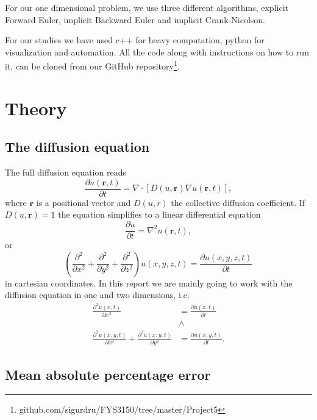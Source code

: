 \documentclass[reprint, english,notitlepage,nofootinbib]{revtex4-1}  %
\begin{document}
For our one dimensional problem, we use three different algorithms, explicit Forward Euler, implicit Backward Euler and implicit Crank-Nicolson.

For our studies we have used c++ for heavy computation, python for visualization and automation. All the code along with instructions on how to run it, can be cloned from our GitHub repository\footnote{github.com/sigurdru/FYS3150/tree/master/Project5}.

\section{Theory}

\subsection*{The diffusion equation}

The full diffusion equation reads
\begin{equation*}
	\frac{\partial u(\mathbf{r}, t)}{\partial t} = \nabla \cdot \left[D(u, \mathbf{r})\nabla u(\mathbf{r}, t)\right],
\end{equation*}
where $\mathbf{r}$ is a positional vector and $D(u,r)$ the collective diffusion coefficient. If $D(u,\mathbf{r}) = 1$ the equation simplifies to a linear differential equation
\begin{equation*}
	\frac{\partial u}{\partial t} = \nabla^2u(\mathbf{r}, t),
\end{equation*}
or
\begin{equation}
	\label{eq:diffusion_equation}
	\left(\frac{\partial^2}{\partial x^2} + \frac{\partial^2}{\partial y^2} + \frac{\partial^2}{\partial z^2}\right) u(x,y,z,t) = \frac{\partial u(x,y,z,t)}{\partial t}
\end{equation}
in cartesian coordinates. In this report we are mainly going to work with the diffusion equation in one and two dimensions, i.e.
\begin{align*}
	 \frac{\partial^2 u(x,t)}{\partial x^2} &= \frac{\partial u(x,t)}{\partial t} \\ &\wedge \\ \frac{\partial^2u(x, y,t)}{\partial x^2} + \frac{\partial^2u(x, y,t)}{\partial y^2} &= \frac{\partial u(x, y,t)}{\partial t}.
\end{align*}

\subsection*{Mean absolute percentage error}
\end{document}

